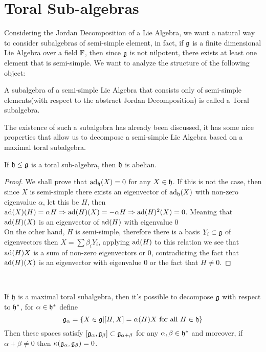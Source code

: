 \section{Toral Sub-algebras}
Considering the Jordan Decomposition of a Lie Algebra, we want a natural way to consider subalgebras of semi-simple element, in fact, if $\mathfrak{g}$ is a finite dimensional Lie Algebra over a field $\mathbb{F}$, then since $\mathfrak{g}$ is not nilpotent, there exists at least one element that is semi-simple. We want to analyze the structure of the following object:
\begin{defi}
A subalgebra of a semi-simple Lie Algebra that consists only of semi-simple elements(with respect to the abstract Jordan Decomposition) is called a Toral subalgebra.
\label{toralsubalg Def}
\end{defi}
The existence of such a subalgebra has already been discussed, it has some nice properties that allow us to decompose a semi-simple Lie Algebra based on a maximal toral subalgebra.
\begin{prop}
	If $\mathfrak{h}\le\mathfrak{g}$ is a toral sub-algebra, then $\mathfrak{h}$ is abelian.
	\label{abeliantoral}
\end{prop}
\begin{proof}
	We shall prove that $\text{ad}_{\mathfrak{h}}(X)=0$ for any $X \in \mathfrak{h}$. If this is not the case, then since $X$ is semi-simple there exists an eigenvector of $\text{ad}_{\mathfrak{h}}(X)$ with non-zero eigenvalue $\alpha$, let this be $H$, then $\text{ad}(X)(H) = \alpha H \Rightarrow \text{ad}(H)(X) = -\alpha H\Rightarrow \text{ad}(H)^2 (X)=0$. Meaning that $\text{ad}(H)(X)$ is an eigenvector of $\text{ad}(H)$ with eigenvalue $0$\\
	On the other hand, $H$ is semi-simple, therefore there is a basis ${Y_i} \subset \mathfrak{g}$ of eigenvectors then $X = \sum \beta_i Y_i$, applying $\text{ad}(H)$ to this relation we see that $\text{ad}(H)X$ is a sum of non-zero eigenvectors or $0$, contradicting the fact that $\text{ad}(H)(X)$ is an eigenvector with eigenvalue $0$ or the fact that $H\not=0$.
\end{proof}\\
\begin{prop}
If $\mathfrak{h}$ is a maximal toral subalgebra, then it's possible to decompose $\mathfrak{g}$ with respect to $\mathfrak{h}^*$, for $\alpha \in \mathfrak{h}^*$ define $$\mathfrak{g}_\alpha = \{X \in \mathfrak{g} | [H,X]=\alpha(H)X \text{ for all } H \in \mathfrak{h}\}$$
Then these spaces satisfy $[\mathfrak{g}_\alpha,\mathfrak{g}_\beta]\subset \mathfrak{g}_{\alpha+\beta}$ for any $\alpha,\beta \in \mathfrak{h}^*$ and moreover, if $\alpha+\beta \not=0$ then $\kappa(\mathfrak{g}_\alpha,\mathfrak{g}_\beta)=0$.
\label{OrthogonalityAndSum}
\end{prop}
